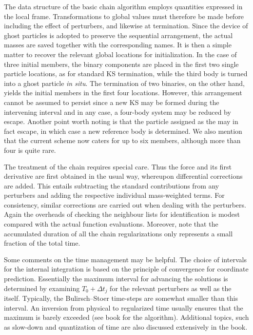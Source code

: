 \documentclass[12pt]{article}
\begin{document}
The data structure of the basic chain algorithm employs quantities expressed
in the local \cm frame.
Transformations to global values must therefore be made before including the
effect of perturbers, and likewise at termination.
Since the device of ghost particles is adopted to preserve the sequential
arrangement, the actual masses are saved together with the corresponding
names.
It is then a simple matter to recover the relevant global locations for
initialization.
In the case of three initial members, the binary components are placed in the
first two single particle locations, as for standard KS termination, while
the third body is turned into a ghost particle {\it in situ}.
The termination of two binaries, on the other hand, yields the initial
members in the first four locations.
However, this arrangement cannot be assumed to persist since a new KS may be
formed during the intervening interval and in any case, a four-body system
may be reduced by escape.
Another point worth noting is that the particle assigned as the \cm may in
fact escape, in which case a new reference body is determined.
We also mention that the current scheme now caters for up to six members,
although more than four is quite rare.

The treatment of the chain \cm requires special care.
Thus the force and its first derivative are first obtained in the usual way,
whereupon differential corrections are added.
This entails subtracting the standard contributions from any perturbers and
adding the respective individual mass-weighted terms.
For consistency, similar corrections are carried out when dealing with the
perturbers.
Again the overheads of checking the neighbour lists for identification is
modest compared with the actual function evaluations.
Moreover, note that the accumulated duration of all the chain
regularizations only represents a small fraction of the total time.

Some comments on the time management may be helpful.
The choice of intervals for the internal integration is based on the
principle of convergence for coordinate prediction.
Essentially the maximum interval for advancing the solutions is determined
by examining $T_0 + {\Delta t}_j$ for the relevant perturbers as well as the
\cm itself.
Typically, the Bulirsch--Stoer time-steps are somewhat smaller than this
interval.
An inversion from physical to regularized time usually ensures that the
maximum is barely exceeded (see book for the algorithm).
Additional topics, such as slow-down and quantization of time are also
discussed extensively in the book.
\end{document}
